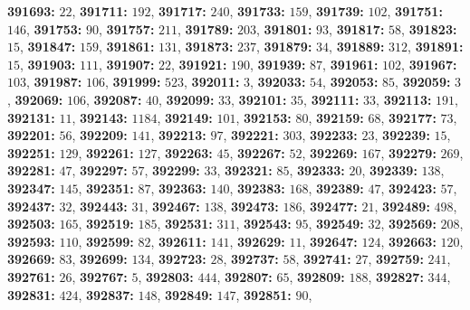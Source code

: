 \textsf{\bfseries 391693:} $22$, \textsf{\bfseries 391711:} $192$, \textsf{\bfseries 391717:} $240$, \textsf{\bfseries 391733:} $159$, \textsf{\bfseries 391739:} $102$, \textsf{\bfseries 391751:} $146$, \textsf{\bfseries 391753:} $90$, \textsf{\bfseries 391757:} $211$, \textsf{\bfseries 391789:} $203$, \textsf{\bfseries 391801:} $93$, \textsf{\bfseries 391817:} $58$, \textsf{\bfseries 391823:} $15$, \textsf{\bfseries 391847:} $159$, \textsf{\bfseries 391861:} $131$, \textsf{\bfseries 391873:} $237$, \textsf{\bfseries 391879:} $34$, \textsf{\bfseries 391889:} $312$, \textsf{\bfseries 391891:} $15$, \textsf{\bfseries 391903:} $111$, \textsf{\bfseries 391907:} $22$, \textsf{\bfseries 391921:} $190$, \textsf{\bfseries 391939:} $87$, \textsf{\bfseries 391961:} $102$, \textsf{\bfseries 391967:} $103$, \textsf{\bfseries 391987:} $106$, \textsf{\bfseries 391999:} $523$, \textsf{\bfseries 392011:} $3$, \textsf{\bfseries 392033:} $54$, \textsf{\bfseries 392053:} $85$, \textsf{\bfseries 392059:} $3$, \textsf{\bfseries 392069:} $106$, \textsf{\bfseries 392087:} $40$, \textsf{\bfseries 392099:} $33$, \textsf{\bfseries 392101:} $35$, \textsf{\bfseries 392111:} $33$, \textsf{\bfseries 392113:} $191$, \textsf{\bfseries 392131:} $11$, \textsf{\bfseries 392143:} $1184$, \textsf{\bfseries 392149:} $101$, \textsf{\bfseries 392153:} $80$, \textsf{\bfseries 392159:} $68$, \textsf{\bfseries 392177:} $73$, \textsf{\bfseries 392201:} $56$, \textsf{\bfseries 392209:} $141$, \textsf{\bfseries 392213:} $97$, \textsf{\bfseries 392221:} $303$, \textsf{\bfseries 392233:} $23$, \textsf{\bfseries 392239:} $15$, \textsf{\bfseries 392251:} $129$, \textsf{\bfseries 392261:} $127$, \textsf{\bfseries 392263:} $45$, \textsf{\bfseries 392267:} $52$, \textsf{\bfseries 392269:} $167$, \textsf{\bfseries 392279:} $269$, \textsf{\bfseries 392281:} $47$, \textsf{\bfseries 392297:} $57$, \textsf{\bfseries 392299:} $33$, \textsf{\bfseries 392321:} $85$, \textsf{\bfseries 392333:} $20$, \textsf{\bfseries 392339:} $138$, \textsf{\bfseries 392347:} $145$, \textsf{\bfseries 392351:} $87$, \textsf{\bfseries 392363:} $140$, \textsf{\bfseries 392383:} $168$, \textsf{\bfseries 392389:} $47$, \textsf{\bfseries 392423:} $57$, \textsf{\bfseries 392437:} $32$, \textsf{\bfseries 392443:} $31$, \textsf{\bfseries 392467:} $138$, \textsf{\bfseries 392473:} $186$, \textsf{\bfseries 392477:} $21$, \textsf{\bfseries 392489:} $498$, \textsf{\bfseries 392503:} $165$, \textsf{\bfseries 392519:} $185$, \textsf{\bfseries 392531:} $311$, \textsf{\bfseries 392543:} $95$, \textsf{\bfseries 392549:} $32$, \textsf{\bfseries 392569:} $208$, \textsf{\bfseries 392593:} $110$, \textsf{\bfseries 392599:} $82$, \textsf{\bfseries 392611:} $141$, \textsf{\bfseries 392629:} $11$, \textsf{\bfseries 392647:} $124$, \textsf{\bfseries 392663:} $120$, \textsf{\bfseries 392669:} $83$, \textsf{\bfseries 392699:} $134$, \textsf{\bfseries 392723:} $28$, \textsf{\bfseries 392737:} $58$, \textsf{\bfseries 392741:} $27$, \textsf{\bfseries 392759:} $241$, \textsf{\bfseries 392761:} $26$, \textsf{\bfseries 392767:} $5$, \textsf{\bfseries 392803:} $444$, \textsf{\bfseries 392807:} $65$, \textsf{\bfseries 392809:} $188$, \textsf{\bfseries 392827:} $344$, \textsf{\bfseries 392831:} $424$, \textsf{\bfseries 392837:} $148$, \textsf{\bfseries 392849:} $147$, \textsf{\bfseries 392851:} $90$, 
